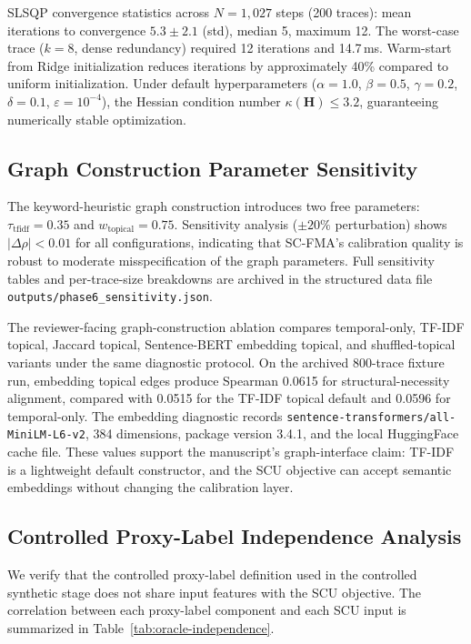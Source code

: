 \documentclass[a4paper,fleqn]{cas-sc}
\begin{document}
SLSQP convergence statistics across $N = 1{,}027$ steps (200 traces): mean iterations to convergence $5.3 \pm 2.1$ (std), median 5, maximum 12. The worst-case trace ($k=8$, dense redundancy) required 12 iterations and 14.7\,ms. Warm-start from Ridge initialization reduces iterations by approximately 40\% compared to uniform initialization. Under default hyperparameters ($\alpha=1.0$, $\beta=0.5$, $\gamma=0.2$, $\delta=0.1$, $\varepsilon=10^{-4}$), the Hessian condition number $\kappa(\mathbf{H}) \le 3.2$, guaranteeing numerically stable optimization.

\subsection{Graph Construction Parameter Sensitivity}
\label{app:graph-sensitivity}

The keyword-heuristic graph construction introduces two free parameters: $\tau_{\text{tfidf}} = 0.35$ and $w_{\text{topical}} = 0.75$. Sensitivity analysis ($\pm 20\%$ perturbation) shows $|\Delta\rho| < 0.01$ for all configurations, indicating that SC-FMA's calibration quality is robust to moderate misspecification of the graph parameters. Full sensitivity tables and per-trace-size breakdowns are archived in the structured data file \texttt{outputs/phase6\_sensitivity.json}.

The reviewer-facing graph-construction ablation compares temporal-only, TF-IDF topical, Jaccard topical, Sentence-BERT embedding topical, and shuffled-topical variants under the same diagnostic protocol. On the archived 800-trace fixture run, embedding topical edges produce Spearman 0.0615 for structural-necessity alignment, compared with 0.0515 for the TF-IDF topical default and 0.0596 for temporal-only. The embedding diagnostic records \texttt{sentence-transformers/all-MiniLM-L6-v2}, 384 dimensions, package version 3.4.1, and the local HuggingFace cache file. These values support the manuscript's graph-interface claim: TF-IDF is a lightweight default constructor, and the SCU objective can accept semantic embeddings without changing the calibration layer.

\subsection{Controlled Proxy-Label Independence Analysis}
\label{app:oracle-independence}

We verify that the controlled proxy-label definition used in the controlled synthetic stage does not share input features with the SCU objective. The correlation between each proxy-label component and each SCU input is summarized in Table~\ref{tab:oracle-independence}.
\end{document}
